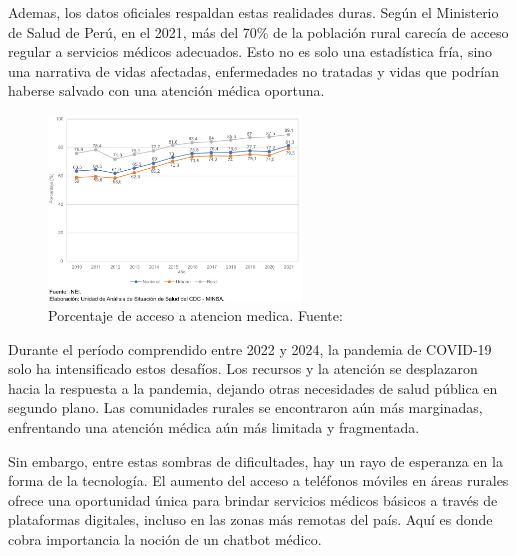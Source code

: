 Ademas, los datos oficiales respaldan estas realidades duras. Según el Ministerio de Salud de Perú, en el 2021, más del 70\% de la población rural carecía de acceso regular a servicios médicos adecuados. Esto no es solo una estadística fría, sino una narrativa de vidas afectadas, enfermedades no tratadas y vidas que podrían haberse salvado con una atención médica oportuna.

\begin{figure}[H]
	\begin{center}
		\includegraphics[width=0.6\textwidth]{1/figures/MINSA.jpeg}
		\caption{Porcentaje de acceso a atencion medica. Fuente: \cite{gl_inei}}
		\label{2:fig}
	\end{center}
\end{figure}

Durante el período comprendido entre 2022 y 2024, la pandemia de COVID-19 solo ha intensificado estos desafíos. Los recursos y la atención se desplazaron hacia la respuesta a la pandemia, dejando otras necesidades de salud pública en segundo plano. Las comunidades rurales se encontraron aún más marginadas, enfrentando una atención médica aún más limitada y fragmentada.

Sin embargo, entre estas sombras de dificultades, hay un rayo de esperanza en la forma de la tecnología. El aumento del acceso a teléfonos móviles en áreas rurales ofrece una oportunidad única para brindar servicios médicos básicos a través de plataformas digitales, incluso en las zonas más remotas del país. Aquí es donde cobra importancia la noción de un chatbot médico.

